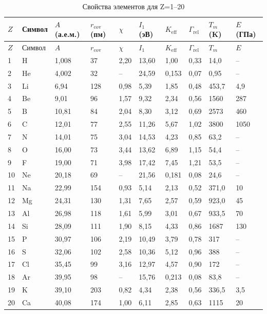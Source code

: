\documentclass[12pt,a4paper]{article}
\newcommand{\Keff}{K_{\mathrm{eff}}}
\begin{document}
	\begin{longtable}{p{0.6cm}p{1.2cm}p{1.2cm}p{1.2cm}p{1.2cm}p{1.2cm}p{1.5cm}p{1.2cm}p{1.2cm}p{1.2cm}}
		\caption{Свойства элементов для Z=1–20} \label{tab:elem-data-first20} \\
		\toprule
		\(Z\) & Символ & \(A\) (а.е.м.) & \(r_{\text{cov}}\) (пм) & \(\chi\) & \(I_1\) (эВ) & \(\Keff\) & \(\Gamma_{\text{rel}}\) & \(T_m\) (K) & \(E\) (ГПа) \\
		\midrule
		\endfirsthead
		\toprule
		\(Z\) & Символ & \(A\) & \(r_{\text{cov}}\) & \(\chi\) & \(I_1\) & \(\Keff\) & \(\Gamma_{\text{rel}}\) & \(T_m\) & \(E\) \\
		\midrule
		\endhead
		1  & H  & 1,008  & 37   & 2,20 & 13,60 & 1,00  & 0,33  & 14,0  & – \\
		2  & He & 4,002  & 32   & –    & 24,59 & 0,153 & 0,07  & 0,95  & – \\
		3  & Li & 6,94   & 128  & 0,98 & 5,39  & 1,85  & 0,48  & 453,7 & 4,9 \\
		4  & Be & 9,01   & 96   & 1,57 & 9,32  & 2,34  & 0,56  & 1560  & 287 \\
		5  & B  & 10,81  & 84   & 2,04 & 8,30  & 3,12  & 0,69  & 2573  & 460\footnotemark \\
		6  & C  & 12,01  & 77   & 2,55 & 11,26 & 5,67  & 1,02  & 3800  & 1050\footnotemark \\
		7  & N  & 14,01  & 75   & 3,04 & 14,53 & 4,23  & 0,85  & 63,2  & – \\
		8  & O  & 16,00  & 73   & 3,44 & 13,62 & 6,89  & 1,15  & 54,4  & – \\
		9  & F  & 19,00  & 71   & 3,98 & 17,42 & 7,45  & 1,21  & 53,5  & – \\
		10 & Ne & 20,18  & 69   & –    & 21,56 & 0,181 & 0,08  & 24,6  & – \\
		11 & Na & 22,99  & 154  & 0,93 & 5,14  & 2,13  & 0,52  & 371,0 & 10 \\
		12 & Mg & 24,31  & 130  & 1,31 & 7,65  & 2,57  & 0,59  & 923,0 & 45 \\
		13 & Al & 26,98  & 118  & 1,61 & 5,99  & 3,01  & 0,67  & 933,5 & 70 \\
		14 & Si & 28,09  & 111  & 1,90 & 8,15  & 4,33  & 0,86  & 1687  & 130 \\
		15 & P  & 30,97  & 106  & 2,19 & 10,49 & 3,79  & 0,78  & 317   & – \\
		16 & S  & 32,06  & 102  & 2,58 & 10,36 & 5,12  & 0,96  & 388   & – \\
		17 & Cl & 35,45  & 99   & 3,16 & 12,97 & 4,57  & 0,90  & 172   & – \\
		18 & Ar & 39,95  & 98   & –    & 15,76 & 0,213 & 0,08  & 83,8  & – \\
		19 & K  & 39,10  & 203  & 0,82 & 4,34  & 2,38  & 0,56  & 336,5 & 3,5 \\
		20 & Ca & 40,08  & 174  & 1,00 & 6,11  & 2,85  & 0,63  & 1115  & 20 \\
		\bottomrule
	\end{longtable}
\end{document}

